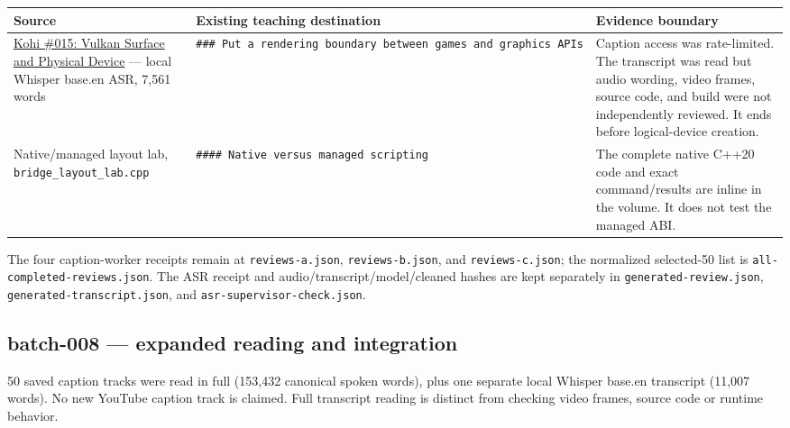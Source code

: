 {\def\LTcaptype{none} %
\begin{longtable}[]{@{}
  >{\raggedright\arraybackslash}p{}
  >{\raggedright\arraybackslash}p{}
  >{\raggedright\arraybackslash}p{}@{}}
\toprule\noalign{}
\begin{minipage}[b]{\linewidth}\raggedright
Source
\end{minipage} & \begin{minipage}[b]{\linewidth}\raggedright
Existing teaching destination
\end{minipage} & \begin{minipage}[b]{\linewidth}\raggedright
Evidence boundary
\end{minipage} \\
\midrule\noalign{}
\endhead
\bottomrule\noalign{}
\endlastfoot
\href{https://www.youtube.com/watch?v=6Kj3O2Ov1RU}{Kohi \#015: Vulkan Surface and Physical Device} --- local Whisper base.en ASR, 7,561 words & \texttt{\#\#\#\ Put\ a\ rendering\ boundary\ between\ games\ and\ graphics\ APIs} & Caption access was rate-limited. The transcript was read but audio wording, video frames, source code, and build were not independently reviewed. It ends before logical-device creation. \\
Native/managed layout lab, \texttt{bridge\_layout\_lab.cpp} & \texttt{\#\#\#\#\ Native\ versus\ managed\ scripting} & The complete native C++20 code and exact command/results are inline in the volume. It does not test the managed ABI. \\
\end{longtable}
}

The four caption-worker receipts remain at \texttt{reviews-a.json}, \texttt{reviews-b.json}, and \texttt{reviews-c.json}; the normalized selected-50 list is \texttt{all-completed-reviews.json}. The ASR receipt and audio/transcript/model/cleaned hashes are kept separately in \texttt{generated-review.json}, \texttt{generated-transcript.json}, and \texttt{asr-supervisor-check.json}.

\subsection{batch-008 --- expanded reading and integration}\label{appendix-877738f6f4d2-batch-008-expanded-reading-and-integration}

50 saved caption tracks were read in full (153,432 canonical spoken words), plus one separate local Whisper base.en transcript (11,007 words). No new YouTube caption track is claimed. Full transcript reading is distinct from checking video frames, source code or runtime behavior.

